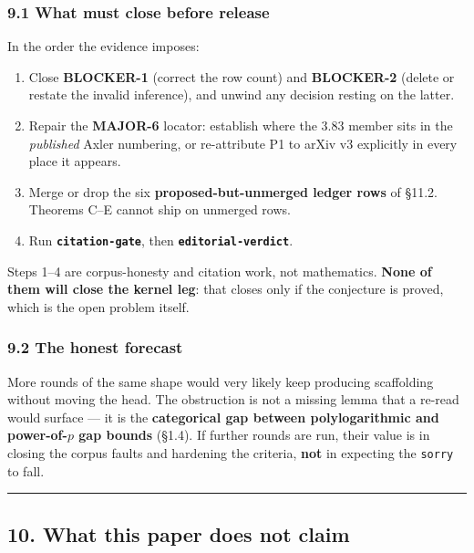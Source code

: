 \documentclass[
  a4paper,
  11pt]{article}
\providecommand{\tightlist}{%
  \setlength{\itemsep}{0pt}\setlength{\parskip}{0pt}}
\begin{document}
\subsubsection{9.1 What must close before
release}\label{91-what-must-close-before-release}

In the order the evidence imposes:

\begin{enumerate}
\def\labelenumi{\arabic{enumi}.}
\tightlist
\item
  Close \textbf{BLOCKER-1} (correct the row count) and
  \textbf{BLOCKER-2} (delete or restate the invalid inference), and
  unwind any decision resting on the latter.
\item
  Repair the \textbf{MAJOR-6} locator: establish where the \(3.83\)
  member sits in the \emph{published} Axler numbering, or re-attribute
  P1 to arXiv v3 explicitly in every place it appears.
\item
  Merge or drop the six \textbf{proposed-but-unmerged ledger rows} of
  §11.2. Theorems C--E cannot ship on unmerged rows.
\item
  Run \textbf{\texttt{citation-gate}}, then
  \textbf{\texttt{editorial-verdict}}.
\end{enumerate}

Steps 1--4 are corpus-honesty and citation work, not mathematics.
\textbf{None of them will close the kernel leg}: that closes only if the
conjecture is proved, which is the open problem itself.

\subsubsection{9.2 The honest forecast}\label{92-the-honest-forecast}

More rounds of the same shape would very likely keep producing
scaffolding without moving the head. The obstruction is not a missing
lemma that a re-read would surface --- it is the \textbf{categorical gap
between polylogarithmic and power-of-\(p\) gap bounds} (§1.4). If
further rounds are run, their value is in closing the corpus faults and
hardening the criteria, \textbf{not} in expecting the \texttt{sorry} to
fall.

\begin{center}\rule{0.5\linewidth}{0.5pt}\end{center}

\subsection{10. What this paper does not
claim}\label{10-what-this-paper-does-not-claim}
\end{document}
